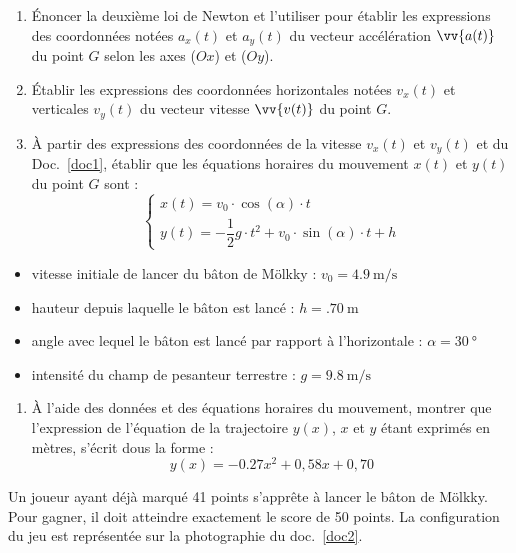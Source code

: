 \documentclass[a4paper,11pt,fleqn]{scrartcl}%
\begin{document}
\begin{enumerate}
    \item Énoncer la deuxième loi de Newton et l'utiliser pour établir les expressions des coordonnées notées $a_x(t)$ et $a_y(t)$ du vecteur accélération $\vv{a(t)}$ du point $G$ selon les axes ($Ox$) et ($Oy$).
    \item Établir les expressions des coordonnées horizontales notées $v_x(t)$ et verticales $v_y(t)$ du vecteur vitesse $\vv{v(t)}$ du point $G$.
    \item À partir des expressions des coordonnées de la vitesse $v_x(t)$ et $v_y(t)$ et du Doc.~\ref{doc1}, établir que les équations horaires du mouvement $x(t)$ et $y(t)$ du point $G$ sont : 
    \[
        \left\{
        \begin{array}{l}
        x(t) = v_0 \cdot \cos(\alpha) \cdot t \\[4pt]
        y(t) = - \dfrac{1}{2} g \cdot t^2 + v_0 \cdot \sin(\alpha)\cdot t + h
        \end{array}
        \right.
    \]
\end{enumerate}

\begin{data}
    \begin{itemize}
        \item vitesse initiale de lancer du bâton de Mölkky : $v_0 = \SI{4,9}{\meter\per\second}$
        \item hauteur depuis laquelle le bâton est lancé : $h = \SI{.70}{\meter}$
        \item angle avec lequel le bâton est lancé par rapport à l'horizontale : $\alpha = \SI{30}{\degree}$
        \item intensité du champ de pesanteur terrestre : $g = \SI{9.8}{\meter\per\second}$
    \end{itemize}
\end{data}

\begin{enumerate}[resume]
    \item À l'aide des données et des équations horaires du mouvement, montrer que l'expression de l'équation de la trajectoire $y(x)$, $x$ et $y$ étant exprimés en mètres, s'écrit dous la forme : $$y(x) = -0.27 x^2 + 0,58 x + 0,70$$
\end{enumerate}
Un joueur ayant déjà marqué 41 points s'apprête à lancer le bâton de Mölkky. Pour gagner, il doit atteindre exactement le score de 50 points. La configuration du jeu est représentée sur la photographie du doc.~\ref{doc2}.
\end{document}
